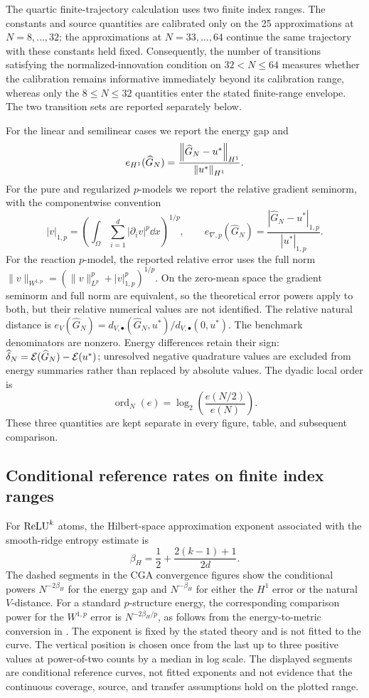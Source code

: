 The quartic finite-trajectory calculation uses two finite index ranges. The constants
and source quantities are calibrated only on the 25 approximations at
$N=8,\ldots,32$; the approximations at $N=33,\ldots,64$ continue the same trajectory
with these constants held fixed. Consequently, the
number of transitions satisfying the normalized-innovation condition on
$32<N\le64$ measures whether the calibration remains informative immediately beyond
its calibration range, whereas only the $8\le N\le32$ quantities enter the stated
finite-range envelope. The two transition sets are reported separately below.

For the linear and semilinear cases we report the energy gap and
\[
 e_{H^1}(\widehat G_N)=\frac{\left\lVert \widehat G_N-u^*\right\rVert_{H^1}}{\left\lVert u^*\right\rVert_{H^1}}.
\]
For the pure and regularized \(p\)-models we report the relative gradient
seminorm, with the componentwise convention
\[
 |v|_{1,p}=\left(\int_\Omega\sum_{i=1}^d|\partial_i v|^p\dd x\right)^{1/p},
 \qquad e_{\nabla,p}(\widehat G_N)=
 \frac{|\widehat G_N-u^*|_{1,p}}{|u^*|_{1,p}}.
\]
For the reaction \(p\)-model, the reported relative error uses the full norm
\(\|v\|_{W^{1,p}}=(\|v\|_{L^p}^p+|v|_{1,p}^p)^{1/p}\).
On the zero-mean space the gradient seminorm and full norm are equivalent,
so the theoretical error powers apply to both, but their relative numerical
values are not identified. The relative natural distance is
\(e_V(\widehat G_N)=d_{V,\bullet}(\widehat G_N,u^*)/d_{V,\bullet}(0,u^*)\).
The benchmark denominators are nonzero. Energy differences retain their sign:
\(\widehat\delta_N=\mathcal{E}(\widehat G_N)-\mathcal{E}(u^*)\); unresolved negative quadrature
values are excluded from energy summaries rather than replaced by absolute values.
The dyadic local order is
\[
 \operatorname{ord}_N(e)=\log_2\!\left(\frac{e(N/2)}{e(N)}\right).
\]
These three quantities are kept separate in every figure, table, and subsequent comparison.

\subsection{Conditional reference rates on finite index ranges}

For \(\operatorname{ReLU}^k\) atoms, the Hilbert-space approximation exponent associated with the smooth-ridge
entropy estimate is
\[
 \beta_H=\frac12+\frac{2(k-1)+1}{2d}.
\]
The dashed segments in the CGA convergence figures show the conditional powers \(N^{-2\beta_H}\) for
the energy gap and \(N^{-\beta_H}\) for either the \(H^1\) error or the natural \(V\)-distance. For a
standard \(p\)-structure energy, the corresponding comparison power for the \(W^{1,p}\) error is
\(N^{-2\beta_H/p}\), as follows from the energy-to-metric conversion in
. The exponent is fixed by the stated theory and is not fitted to the curve.
The vertical position is chosen once from the last up to three positive values at power-of-two counts by a median in log scale. The displayed segments are conditional reference curves, not fitted exponents and not evidence that the continuous coverage, source, and transfer assumptions hold on the plotted range.

